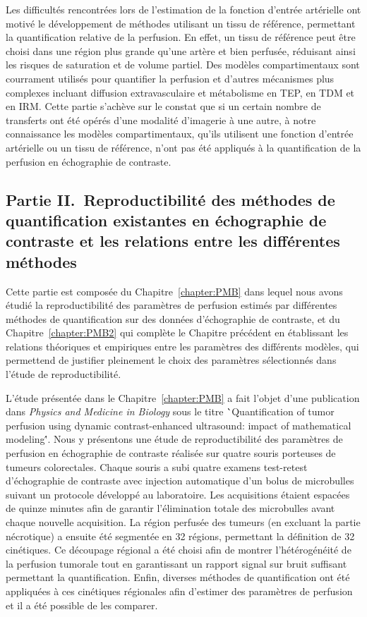 \begin{otherlanguage}{francais}
Les difficult\'es rencontr\'ees lors de l'estimation de la fonction d'entr\'ee art\'erielle ont motiv\'e le d\'eveloppement de m\'ethodes utilisant un tissu de r\'ef\'erence, permettant la quantification relative de la perfusion.
En effet, un tissu de r\'ef\'erence peut \^etre choisi dans une r\'egion plus grande qu'une art\`ere et bien perfus\'ee, r\'eduisant ainsi les risques de saturation et de volume partiel.
Des mod\`eles compartimentaux sont courrament utilis\'es pour quantifier la perfusion et d'autres m\'ecanismes plus complexes incluant diffusion extravasculaire et m\'etabolisme en TEP, en TDM et en IRM.
Cette partie s'ach\`eve sur le constat que si un certain nombre de transferts ont \'et\'e op\'er\'es d'une modalit\'e d'imagerie \`a une autre, \`a notre connaissance les mod\`eles compartimentaux, qu'ils utilisent une fonction d'entr\'ee art\'erielle ou un tissu de r\'ef\'erence, n'ont pas \'et\'e appliqu\'es \`a la quantification de la perfusion en \'echographie de contraste.

\subsection*{Partie II.~Reproductibilit\'e des m\'ethodes de quantification existantes en \'echographie de contraste et les relations entre les diff\'erentes m\'ethodes}
Cette partie est compos\'ee du Chapitre~\ref{chapter:PMB} dans lequel nous avons \'etudi\'e la reproductibilit\'e des param\`etres de perfusion estim\'es par diff\'erentes m\'ethodes de quantification sur des donn\'ees d'\'echographie de contraste, et du Chapitre~\ref{chapter:PMB2} qui compl\`ete le Chapitre pr\'ec\'edent en \'etablissant les relations th\'eoriques et empiriques entre les param\`etres des diff\'erents mod\`eles, qui permettend de justifier pleinement le choix des param\`etres s\'electionn\'es dans l'\'etude de reproductibilit\'e.

L'\'etude pr\'esent\'ee dans le Chapitre~\ref{chapter:PMB} a fait l'objet d'une publication dans {\em Physics and Medicine in Biology} sous le titre \``Quantification of tumor perfusion using dynamic contrast-enhanced ultrasound: impact of mathematical modeling\''.
Nous y pr\'esentons une \'etude de reproductibilit\'e des param\`etres de perfusion en \'echographie de contraste r\'ealis\'ee sur quatre souris porteuses de tumeurs colorectales.
Chaque souris a subi quatre examens test-retest d'\'echographie de contraste avec injection automatique d'un bolus de microbulles suivant un protocole d\'evelopp\'e au laboratoire.
Les acquisitions \'etaient espac\'ees de quinze minutes afin de garantir l'\'elimination totale des microbulles avant chaque nouvelle acquisition.
La r\'egion perfus\'ee des tumeurs (en excluant la partie n\'ecrotique) a ensuite \'et\'e segment\'ee en 32 r\'egions, permettant la d\'efinition de 32 cin\'etiques.
Ce d\'ecoupage r\'egional a \'et\'e choisi afin de montrer l'h\'et\'erog\'en\'eit\'e de la perfusion tumorale tout en garantissant un rapport signal sur bruit suffisant permettant la quantification.
Enfin, diverses m\'ethodes de quantification ont \'et\'e appliqu\'ees \`a ces cin\'etiques r\'egionales afin d'estimer des param\`etres de perfusion et il a \'et\'e possible de les comparer.


\end{otherlanguage}
